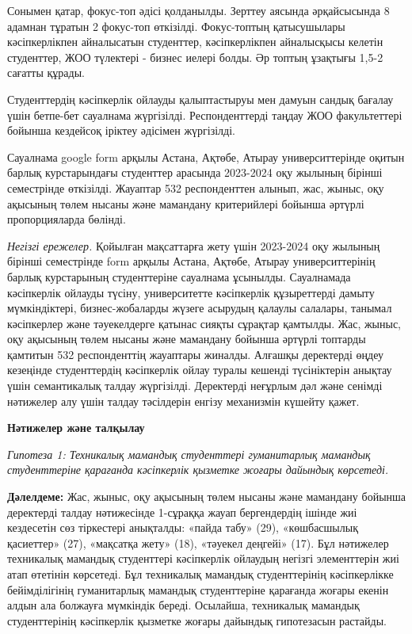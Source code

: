 Сонымен қатар, фокус-топ әдісі қолданылды. Зерттеу аясында әрқайсысында
8 адамнан тұратын 2 фокус-топ өткізілді. Фокус-топтың қатысушылары
кәсіпкерлікпен айналысатын студенттер, кәсіпкерлікпен айналысқысы
келетін студенттер, ЖОО түлектері - бизнес иелері болды. Әр топтың
ұзақтығы 1,5-2 сағатты құрады.

Студенттердің кәсіпкерлік ойлауды қалыптастыруы мен дамуын сандық
бағалау үшін бетпе-бет сауалнама жүргізілді. Респонденттерді таңдау ЖОО
факультеттері бойынша кездейсоқ іріктеу әдісімен жүргізілді.

Сауалнама google form арқылы Астана, Ақтөбе, Атырау университтерінде
оқитын барлық курстарындағы студенттер арасында 2023-2024 оқу жылының
бірінші семестрінде өткізілді. Жауаптар 532 респонденттен алынып, жас,
жыныс, оқу ақысының төлем нысаны және мамандану критерийлері бойынша
әртүрлі пропорцияларда бөлінді.

\emph{Негізгі ережелер.} Қойылған мақсаттарға жету үшін 2023-2024 оқу
жылының бірінші семестрінде form арқылы Астана, Ақтөбе, Атырау
университтерінің барлық курстарының студенттеріне сауалнама ұсынылды.
Сауалнамада кәсіпкерлік ойлауды түсіну, университетте кәсіпкерлік
құзыреттерді дамыту мүмкіндіктері, бизнес-жобаларды жүзеге асырудың
қалаулы салалары, танымал кәсіпкерлер және тәуекелдерге қатынас сияқты
сұрақтар қамтылды. Жас, жыныс, оқу ақысының төлем нысаны және мамандану
бойынша әртүрлі топтарды қамтитын 532 респонденттің жауаптары жиналды.
Алғашқы деректерді өңдеу кезеңінде студенттердің кәсіпкерлік ойлау
туралы кешенді түсініктерін анықтау үшін семантикалық талдау жүргізілді.
Деректерді неғұрлым дәл және сенімді нәтижелер алу үшін талдау
тәсілдерін енгізу механизмін күшейту қажет.

{\bfseries Нәтижелер және талқылау}

\emph{Гипотеза 1: Техникалық мамандық студенттері гуманитарлық мамандық
студенттеріне қарағанда кәсіпкерлік қызметке жоғары дайындық көрсетеді.}

{\bfseries Дәлелдеме:} Жас, жыныс, оқу ақысының төлем нысаны және мамандану
бойынша деректерді талдау нәтижесінде 1-сұраққа жауап бергендердің
ішінде жиі кездесетін сөз тіркестері анықталды: «пайда табу» (29),
«көшбасшылық қасиеттер» (27), «мақсатқа жету» (18), «тәуекел деңгейі»
(17). Бұл нәтижелер техникалық мамандық студенттері кәсіпкерлік ойлаудың
негізгі элементтерін жиі атап өтетінін көрсетеді. Бұл техникалық
мамандық студенттерінің кәсіпкерлікке бейімділігінің гуманитарлық
мамандық студенттеріне қарағанда жоғары екенін алдын ала болжауға
мүмкіндік береді. Осылайша, техникалық мамандық студенттерінің
кәсіпкерлік қызметке жоғары дайындық гипотезасын растайды.

